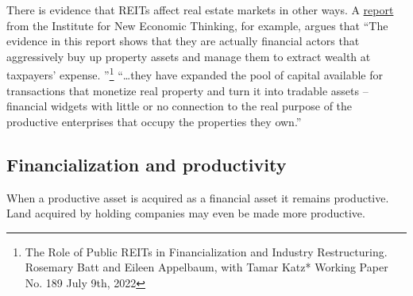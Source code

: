 There is evidence that REITs affect real estate markets in other ways. A \href{https://www.ineteconomics.org/research/research-papers/the-role-of-public-reits-in-financialization-and-industry-restructuring}{report} from the Institute for New Economic Thinking, for example, argues that ``The evidence in this report shows that they are actually financial actors that aggressively buy up property assets and manage them to extract wealth at taxpayers’ expense. ''\footnote{The Role of Public REITs in Financialization and Industry Restructuring. Rosemary Batt and Eileen Appelbaum, with Tamar Katz* Working Paper No. 189 July 9th, 2022} ``\dots they have expanded the pool of capital available for transactions that monetize real property and turn it into tradable assets – financial widgets with little or no connection to the real purpose of the productive enterprises that occupy the properties they own.''

\subsection{Financialization and productivity}

When  a productive asset is acquired as a financial asset it remains productive. %
Land acquired by holding companies may even be made more productive. 


